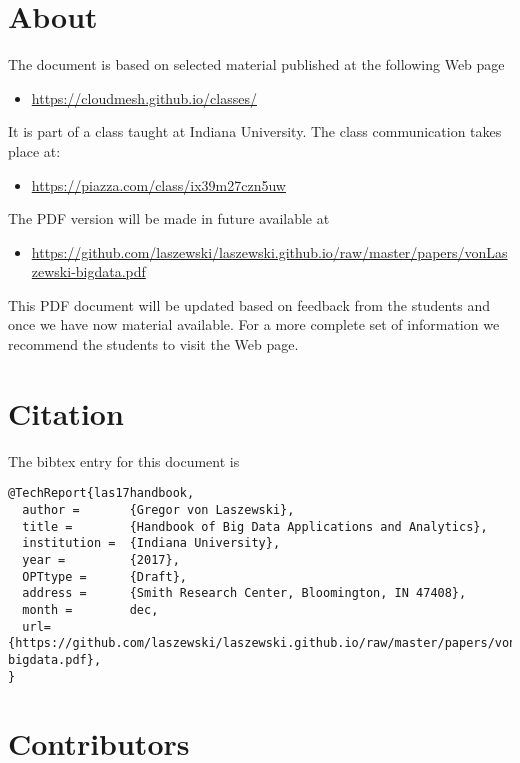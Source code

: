 \FILENAME

\section{About}\label{about}

The document is based on selected material published at the following
Web page

\begin{itemize}
\item
  \url{https://cloudmesh.github.io/classes/}
\end{itemize}

It is part of a class taught at Indiana University. The class
communication takes place at:

\begin{itemize}
\item
  \url{https://piazza.com/class/ix39m27czn5uw}
\end{itemize}

The PDF version will be made in future available at 

\begin{itemize}
\item
\url{https://github.com/laszewski/laszewski.github.io/raw/master/papers/vonLaszewski-bigdata.pdf}
\end{itemize}

This PDF document will be updated based on feedback from the students
and once we have now material available. For a more complete set of
information we recommend the students to visit the Web page.

\section{Citation}

The bibtex entry for this document is

\begin{verbatim}
@TechReport{las17handbook,
  author =       {Gregor von Laszewski},
  title =        {Handbook of Big Data Applications and Analytics},
  institution =  {Indiana University},
  year =         {2017},
  OPTtype =      {Draft},
  address =      {Smith Research Center, Bloomington, IN 47408},
  month =        dec,
  url={https://github.com/laszewski/laszewski.github.io/raw/master/papers/vonLaszewski-bigdata.pdf},
}
\end{verbatim}

\section{Contributors}

